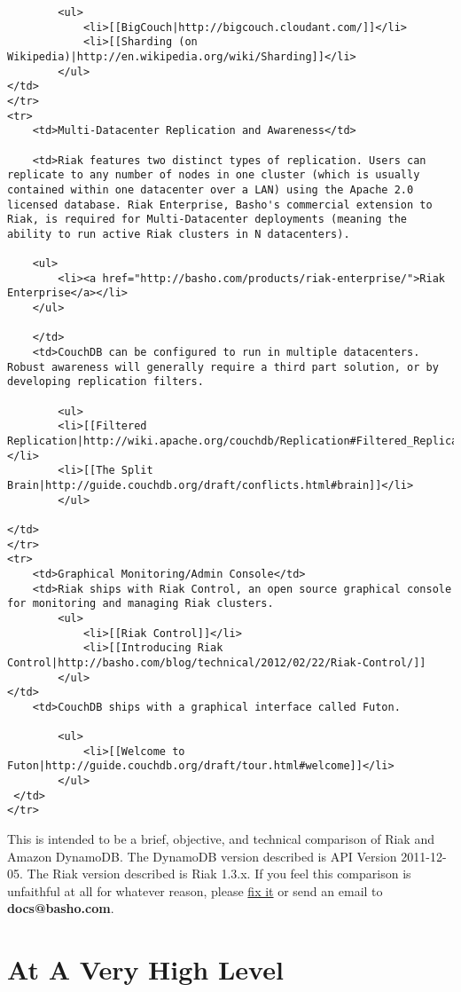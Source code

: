 \documentclass[letter]{book}
\newcounter{tab}[chapter]
\begin{document}
\begin{shaded}
\begin{verbatim}
        <ul>
            <li>[[BigCouch|http://bigcouch.cloudant.com/]]</li>
            <li>[[Sharding (on Wikipedia)|http://en.wikipedia.org/wiki/Sharding]]</li>
        </ul>
</td>
</tr>
<tr>
    <td>Multi-Datacenter Replication and Awareness</td>

    <td>Riak features two distinct types of replication. Users can replicate to any number of nodes in one cluster (which is usually contained within one datacenter over a LAN) using the Apache 2.0 licensed database. Riak Enterprise, Basho's commercial extension to Riak, is required for Multi-Datacenter deployments (meaning the ability to run active Riak clusters in N datacenters).

    <ul>
        <li><a href="http://basho.com/products/riak-enterprise/">Riak Enterprise</a></li>
    </ul>

    </td>
    <td>CouchDB can be configured to run in multiple datacenters. Robust awareness will generally require a third part solution, or by developing replication filters.

        <ul>
        <li>[[Filtered Replication|http://wiki.apache.org/couchdb/Replication#Filtered_Replication]]</li>
        <li>[[The Split Brain|http://guide.couchdb.org/draft/conflicts.html#brain]]</li>
        </ul>

</td>
</tr>
<tr>
    <td>Graphical Monitoring/Admin Console</td>
    <td>Riak ships with Riak Control, an open source graphical console for monitoring and managing Riak clusters.
        <ul>
            <li>[[Riak Control]]</li>
            <li>[[Introducing Riak Control|http://basho.com/blog/technical/2012/02/22/Riak-Control/]]
        </ul>
</td>
    <td>CouchDB ships with a graphical interface called Futon.

        <ul>
            <li>[[Welcome to Futon|http://guide.couchdb.org/draft/tour.html#welcome]]</li>
        </ul>
 </td>
</tr>
\end{verbatim}\end{shaded}

This is intended to be a brief, objective, and technical comparison of Riak and Amazon DynamoDB. The DynamoDB version described is API Version 2011-12-05. The Riak version described is Riak 1.3.x. If you feel this comparison is unfaithful at all for whatever reason, please \href{https://github.com/basho/basho_docs/issues/new}{fix it} or send an email to \textbf{docs@basho.com}.

\section{At A Very High Level}\label{at-a-very-high-level-3}
\end{document}

